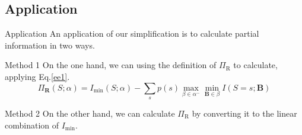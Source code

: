 \subsection{Application}
\begin{frame}{Application}
An application of our simplification is to calculate partial information in two ways. \\
\begin{block}{Method 1}
        On the one hand, we can using the definition of $\Pi_{\mathrm{R}}$ to calculate, applying Eq.\ref{ee1}.
\begin{equation}\Pi_{\mathbf{R}}(S ; \alpha)=I_{\min }(S ; \alpha)-\sum_{s} p(s) \max _{\beta \in \alpha^{-}} \min _{\mathbf{B} \in \beta} I(S=s ; \mathbf{B})
\label{ee1}
\end{equation}
    \end{block}
\begin{block}{Method 2}  
On the other hand, we can calculate $\Pi_{\mathrm{R}}$ by converting it to the linear combination of $I_{\min}$. 
\end{block}
\end{frame}

